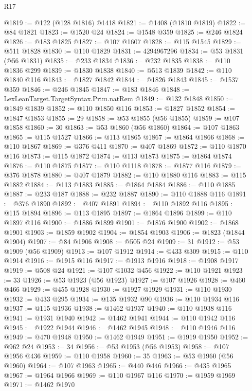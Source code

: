 \begin{lexlean}{R17}
\begin{coremodule}
{{{{{{{{{{{{{{{{{{{{{{{{{{{{{{{{{{{{{{{{{{{{{{{{{{{{{{{{{{{{{{{{{{{{{{{{{{{{{{{{{{{{{@1819 := @122 (@128 @1816) @1418
@1821 := @1408 (@1810 @1819)
@1822 := @84 @1821
@1823 := @1520 @24
@1824 := @1548 @359
@1825 := @246 @1824
@1826 := @183 @1825
@1827 := @107 @1607
@1828 := @115 @1545
@1829 := @511 @1828
@1830 := @110 @1829
@1831 := 4294967296
@1834 := @53 @1831 (@56 @1831)
@1835 := @233 @1834
@1836 := @232 @1835
@1838 := @110 @1836 @299
@1839 := @1830 @1838
@1840 := @513 @1839
@1842 := @110 @1840 @116
@1843 := @1827 @1842
@1844 := @1826 @1843
@1845 := @1537 @359
@1846 := @246 @1845
@1847 := @183 @1846
@1848 := LexLeanTarget.TargetSyntax.Prim.natRem
@1849 := @132 @1848
@1850 := @1849 @1839
@1852 := @110 @1850 @116
@1853 := @1827 @1852
@1854 := @1847 @1853
@1855 := 29
@1858 := @53 @1855 (@56 @1855)
@1859 := @107 @1858
@1860 := 30
@1863 := @53 @1860 (@56 @1860)
@1864 := @107 @1863
@1865 := @115 @1527
@1866 := @113 @1865
@1867 := @1864 @1866
@1868 := @110 @1867
@1869 := @376 @411
@1870 := @407 @1869
@1872 := @110 @1870 @116
@1873 := @115 @1872
@1874 := @113 @1873
@1875 := @1864 @1874
@1876 := @110 @1875
@1877 := @110 @1118
@1878 := @1877 @116
@1879 := @376 @1878
@1880 := @407 @1879
@1882 := @110 @1880 @116
@1883 := @115 @1882
@1884 := @113 @1883
@1885 := @1864 @1884
@1886 := @110 @1885
@1887 := @233 @187
@1888 := @232 @1887
@1890 := @110 @1888 @116
@1891 := @376 @1890
@1892 := @407 @1891
@1894 := @110 @1892 @116
@1895 := @115 @1894
@1896 := @113 @1895
@1897 := @1864 @1896
@1899 := @110 @1897 @116
@1900 := @1886 @1899
@1901 := @1876 @1900
@1902 := @1868 @1901
@1903 := @1859 @1902
@1904 := @1854 @1903
@1906 := @1823 (@1844 @1904)
@1907 := @84 @1906
@1908 := @505 @24
@1909 := 31
@1912 := @53 @1909 (@56 @1909)
@1913 := @107 @1912
@1914 := @433 @309
@1915 := @110 @1914
@1916 := @1915 @116
@1917 := @1913 @1916
@1918 := @1908 @1917
@1919 := @508 @24
@1921 := @107 @1032 @456
@1922 := @110 @1921
@1923 := 33
@1926 := @53 @1923 (@56 @1923)
@1927 := @107 @1926
@1928 := @460 @466
@1929 := @455 @1928
@1930 := @1927 @1929
@1931 := @110 @1930
@1932 := @433 @295
@1934 := @135 @1932 @90
@1936 := @110 @1934 @116
@1937 := @115 @1936
@1938 := @1462 @1937
@1940 := @110 @1938 @116
@1941 := @1931 @1940
@1942 := @1462 @1941
@1944 := @110 @1942 @116
@1945 := @1922 @1944
@1946 := @1462 @1945
@1948 := @110 @1946 @116
@1949 := @470 @1948
@1950 := @1462 @1949
@1951 := @1919 @1950
@1952 := @962 @24
@1953 := 34
@1956 := @53 @1953 (@56 @1953)
@1958 := @107 @1956 @436
@1959 := @110 @1958
@1960 := 35
@1963 := @53 @1960 (@56 @1960)
@1964 := @107 @1963
@1965 := @440 @446
@1966 := @435 @1965
@1967 := @1964 @1966
@1969 := @110 @1967 @116
@1970 := @1959 @1969
@1971 := @1462 @1970
}}}}}}}}}}}}}}}}}}}}}}}}}}}}}}}}}}}}}}}}}}}}}}}}}}}}}}}}}}}}}}}}}}}}}}}}}}}}}}}}}}}}}
\end{coremodule}
\end{lexlean}
